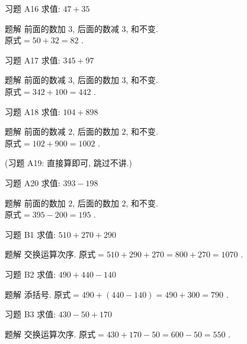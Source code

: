 \documentclass[content.tex]{subfiles}
\begin{document}
\begin{frame}{习题 A16}
求值: $47+35$
\begin{exampleblock}{题解}
前面的数加 $3$, 后面的数减 $3$, 和不变. \\
$\text{原式} = 50 + 32 = 82$ .
\end{exampleblock}
\end{frame}

\begin{frame}{习题 A17}
求值: $345+97$
\begin{exampleblock}{题解}
前面的数减 $3$, 后面的数加 $3$, 和不变. \\
$\text{原式} = 342 + 100 = 442$ .
\end{exampleblock}
\end{frame}

\begin{frame}{习题 A18}
求值: $104+898$
\begin{exampleblock}{题解}
前面的数减 $2$, 后面的数加 $2$, 和不变. \\
$\text{原式} = 102+900 = 1002$ .
\end{exampleblock}
\bigbreak
\centering (习题 A19: 直接算即可, 跳过不讲.)
\end{frame}

\begin{frame}{习题 A20}
求值: $393-198$
\begin{exampleblock}{题解}
前面的数加 $2$, 后面的数加 $2$, 和不变. \\
$\text{原式} = 395-200 = 195$ .
\end{exampleblock}
\end{frame}

\begin{frame}{习题 B1}
求值: $510+270+290$
\begin{exampleblock}{题解}
交换运算次序. $\text{原式} = 510+290+270 = 800+270 = 1070$ .
\end{exampleblock}
\end{frame}

\begin{frame}{习题 B2}
求值: $490+440-140$
\begin{exampleblock}{题解}
添括号. $\text{原式} = 490+(440-140) = 490+300 = 790$ .
\end{exampleblock}
\end{frame}

\begin{frame}{习题 B3}
求值: $430-50+170$
\begin{exampleblock}{题解}
交换运算次序. $\text{原式} = 430+170-50 = 600-50 = 550$ .
\end{exampleblock}
\end{frame}
\end{document}

